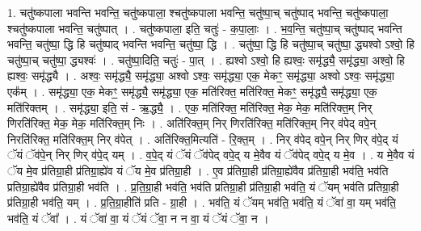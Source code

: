 \documentclass[17pt]{extarticle}
\begin{document}
1. चतु॑ष्कपाला भवन्ति भवन्ति॒ चतु॑ष्कपाला॒ श्चतु॑ष्कपाला भवन्ति॒ चतु॑ष्पा॒च् चतु॑ष्पाद् भवन्ति॒ चतु॑ष्कपाला॒ श्चतु॑ष्कपाला भवन्ति॒ चतु॑ष्पात् । . चतु॑ष्कपाला॒ इति॒ चतुः॑ - क॒पा॒लाः॒ । . भ॒व॒न्ति॒ चतु॑ष्पा॒च् चतु॑ष्पाद् भवन्ति भवन्ति॒ चतु॑ष्पा॒ द्धि हि चतु॑ष्पाद् भवन्ति भवन्ति॒ चतु॑ष्पा॒ द्धि । . चतु॑ष्पा॒ द्धि हि चतु॑ष्पा॒च् चतु॑ष्पा॒ द्ध्यश्वो ऽश्वो॒ हि चतु॑ष्पा॒च् चतु॑ष्पा॒ द्ध्यश्वः॑ । . चतु॑ष्पा॒दिति॒ चतुः॑ - पा॒त् । . ह्यश्वो ऽश्वो॒ हि ह्यश्वः॒ समृ॑द्ध्यै॒ समृ॑द्ध्या॒ अश्वो॒ हि ह्यश्वः॒ समृ॑द्ध्यै । . अश्वः॒ समृ॑द्ध्यै॒ समृ॑द्ध्या॒ अश्वो ऽश्वः॒ समृ॑द्ध्या॒ एक॒ मेकꣳ॒॒ समृ॑द्ध्या॒ अश्वो ऽश्वः॒ समृ॑द्ध्या॒ एक᳚म् । . समृ॑द्ध्या॒ एक॒ मेकꣳ॒॒ समृ॑द्ध्यै॒ समृ॑द्ध्या॒ एक॒ मति॑रिक्त॒ मति॑रिक्त॒ मेकꣳ॒॒ समृ॑द्ध्यै॒ समृ॑द्ध्या॒ एक॒ मति॑रिक्तम् । . समृ॑द्ध्या॒ इति॒ सं - ऋ॒द्ध्यै॒ । . एक॒ मति॑रिक्त॒ मति॑रिक्त॒ मेक॒ मेक॒ मति॑रिक्त॒म् निर् णिरति॑रिक्त॒ मेक॒ मेक॒ मति॑रिक्त॒म् निः । . अति॑रिक्त॒म् निर् णिरति॑रिक्त॒ मति॑रिक्त॒म् निर् व॑पेद् वपे॒न् निरति॑रिक्त॒ मति॑रिक्त॒म् निर् व॑पेत् । . अति॑रिक्त॒मित्यति॑ - रि॒क्त॒म् । . निर् व॑पेद् वपे॒न् निर् णिर् व॑पे॒द् यं ॅयं ॅव॑पे॒न् निर् णिर् व॑पे॒द् यम् । . व॒पे॒द् यं ॅयं ॅव॑पेद् वपे॒द् य मे॒वैव यं ॅव॑पेद् वपे॒द् य मे॒व । . य मे॒वैव यं ॅय मे॒व प्र॑तिग्रा॒ही प्र॑तिग्रा॒ह्ये॑व यं ॅय मे॒व प्र॑तिग्रा॒ही । . ए॒व प्र॑तिग्रा॒ही प्र॑तिग्रा॒ह्ये॑वैव प्र॑तिग्रा॒ही भव॑ति॒ भव॑ति प्रतिग्रा॒ह्ये॑वैव प्र॑तिग्रा॒ही भव॑ति । . प्र॒ति॒ग्रा॒ही भव॑ति॒ भव॑ति प्रतिग्रा॒ही प्र॑तिग्रा॒ही भव॑ति॒ यं ॅयम् भव॑ति प्रतिग्रा॒ही प्र॑तिग्रा॒ही भव॑ति॒ यम् । . प्र॒ति॒ग्रा॒हीति॑ प्रति - ग्रा॒ही । . भव॑ति॒ यं ॅयम् भव॑ति॒ भव॑ति॒ यं ॅवा॑ वा॒ यम् भव॑ति॒ भव॑ति॒ यं ॅवा᳚ । . यं ॅवा॑ वा॒ यं ॅयं ॅवा॒ न न वा॒ यं ॅयं ॅवा॒ न । \newline
\end{document}

